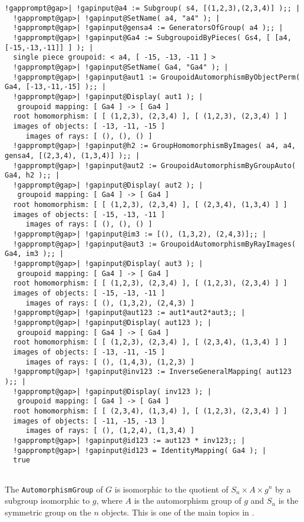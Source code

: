 \documentclass[a4paper,11pt]{report}
\begin{document}
{{{\begin{Verbatim}[commandchars=!@|,fontsize=\small,frame=single,label=Example]
  !gapprompt@gap>| !gapinput@a4 := Subgroup( s4, [(1,2,3),(2,3,4)] );; |
  !gapprompt@gap>| !gapinput@SetName( a4, "a4" ); |
  !gapprompt@gap>| !gapinput@gensa4 := GeneratorsOfGroup( a4 );; |
  !gapprompt@gap>| !gapinput@Ga4 := SubgroupoidByPieces( Gs4, [ [a4, [-15,-13,-11]] ] ); |
  single piece groupoid: < a4, [ -15, -13, -11 ] >
  !gapprompt@gap>| !gapinput@SetName( Ga4, "Ga4" ); |
  !gapprompt@gap>| !gapinput@aut1 := GroupoidAutomorphismByObjectPerm( Ga4, [-13,-11,-15] );; |
  !gapprompt@gap>| !gapinput@Display( aut1 ); |
   groupoid mapping: [ Ga4 ] -> [ Ga4 ]
  root homomorphism: [ [ (1,2,3), (2,3,4) ], [ (1,2,3), (2,3,4) ] ]
  images of objects: [ -13, -11, -15 ]
     images of rays: [ (), (), () ]
  !gapprompt@gap>| !gapinput@h2 := GroupHomomorphismByImages( a4, a4, gensa4, [(2,3,4), (1,3,4)] );; |
  !gapprompt@gap>| !gapinput@aut2 := GroupoidAutomorphismByGroupAuto( Ga4, h2 );; |
  !gapprompt@gap>| !gapinput@Display( aut2 ); |
   groupoid mapping: [ Ga4 ] -> [ Ga4 ]
  root homomorphism: [ [ (1,2,3), (2,3,4) ], [ (2,3,4), (1,3,4) ] ]
  images of objects: [ -15, -13, -11 ]
     images of rays: [ (), (), () ]
  !gapprompt@gap>| !gapinput@im3 := [(), (1,3,2), (2,4,3)];; |
  !gapprompt@gap>| !gapinput@aut3 := GroupoidAutomorphismByRayImages( Ga4, im3 );; |
  !gapprompt@gap>| !gapinput@Display( aut3 ); |
   groupoid mapping: [ Ga4 ] -> [ Ga4 ]
  root homomorphism: [ [ (1,2,3), (2,3,4) ], [ (1,2,3), (2,3,4) ] ]
  images of objects: [ -15, -13, -11 ]
     images of rays: [ (), (1,3,2), (2,4,3) ]
  !gapprompt@gap>| !gapinput@aut123 := aut1*aut2*aut3;; |
  !gapprompt@gap>| !gapinput@Display( aut123 ); |
   groupoid mapping: [ Ga4 ] -> [ Ga4 ]
  root homomorphism: [ [ (1,2,3), (2,3,4) ], [ (2,3,4), (1,3,4) ] ]
  images of objects: [ -13, -11, -15 ]
     images of rays: [ (), (1,4,3), (1,2,3) ]
  !gapprompt@gap>| !gapinput@inv123 := InverseGeneralMapping( aut123 );; |
  !gapprompt@gap>| !gapinput@Display( inv123 ); |
   groupoid mapping: [ Ga4 ] -> [ Ga4 ]
  root homomorphism: [ [ (2,3,4), (1,3,4) ], [ (1,2,3), (2,3,4) ] ]
  images of objects: [ -11, -15, -13 ]
     images of rays: [ (), (1,2,4), (1,3,4) ]
  !gapprompt@gap>| !gapinput@id123 := aut123 * inv123;; |
  !gapprompt@gap>| !gapinput@id123 = IdentityMapping( Ga4 ); |
  true
  
\end{Verbatim}
 

 The  \texttt{AutomorphismGroup} of $G$ is isomorphic to the quotient of $S_n \times A \times g^n$ by a subgroup isomorphic to $g$, where $A$ is the automorphism group of $g$ and $S_n$ is the symmetric group on the $n$ objects. This is one of the main topics in \cite{AlWe}. 

}}}
\end{document}
